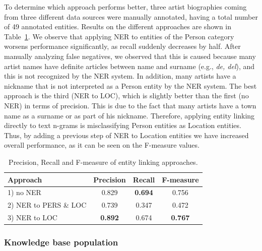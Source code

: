 To determine which approach performs better, three artist biographies coming from three different data sources were manually annotated, having a total number of 49 annotated entities. %
Results on the different approaches are shown in Table~\ref{tbl:musicology:res1}. We observe that applying NER to entities of the Person category worsens performance significantly, as recall suddenly decreases by half. After manually analyzing false negatives, we observed that this is caused because many artist names have definite articles between name and surname (e.g., \textit{de, del}), and this is not recognized by the NER system. In addition, many artists have a nickname that is not interpreted as a Person entity by the NER system. The best approach is the third (NER to LOC), which is slightly better than the first (no NER) in terms of precision. This is due to the fact that many artists have a town name as a surname or as part of his nickname. Therefore, applying entity linking directly to text n-grams is misclassifying Person entities as Location entities. Thus, by adding a previous step of NER to Location entities we have increased overall performance, as it can be seen on the F-measure values.

\begin{table}
	\centering
	  \begin{tabular}{  l c c c }
    \hline
    Approach & Precision & Recall & F-measure \\ 
    \hline
    1) no NER & 0.829 & \textbf{0.694} & 0.756 \\ 
    2) NER to PERS \& LOC & 0.739 & 0.347 & 0.472 \\
    3) NER to LOC & \textbf{0.892} & 0.674 & \textbf{0.767} \\
    \hline
  \end{tabular}
	\caption{Precision, Recall and F-measure of entity linking approaches.}
	
	\label{tbl:musicology:res1}
\end{table}

\subsubsection{Knowledge base population}
\label{sec:musicology:ie}

